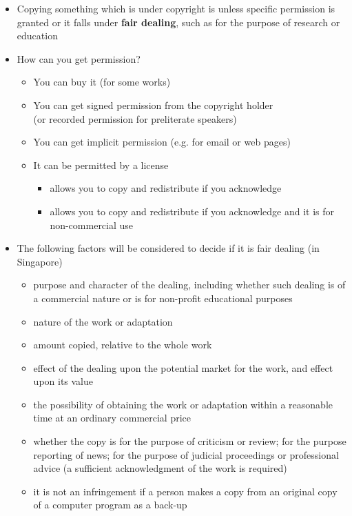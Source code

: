 \documentclass[a4paper,landscape,headrule,footrule,dvips]{foils}
\begin{document}
\begin{CJK}{UTF8}{min}
\begin{center}
\end{center}


\begin{itemize}
\item Copying something which is under copyright is  unless
  specific permission is granted or it falls under \textbf{fair
    dealing}, such as for the purpose of research or education
\item How can you get permission?
  \begin{itemize}
  \item You can buy it (for some works)
  \item You can get signed permission from the copyright holder
\\ (or recorded permission for preliterate speakers)
  \item You can get implicit permission (e.g. for email or web pages)
  \item It can be permitted by a license
    \begin{itemize}
    \item {} allows you to copy and redistribute if you acknowledge
    \item {} allows you to copy and redistribute if you
      acknowledge and it is for non-commercial use
    \end{itemize}
  \end{itemize}

\newpage {}
\item The following factors will be considered to decide if it is fair
  dealing (in Singapore)
  \begin{itemize}
  \item  purpose and character of the dealing, including whether such dealing is of a commercial nature or is for non-profit educational purposes
  \item  nature of the work or adaptation
  \item amount copied, relative to the whole work
  \item  effect of the dealing upon the potential market for the work, and effect upon its value
  \item the possibility of obtaining the work or adaptation within a reasonable time at an ordinary commercial price
  \item whether the copy is for the purpose of criticism or review; for the purpose reporting of news; for the purpose of judicial proceedings or professional advice (a sufficient acknowledgment of the work is required)
  \item it is not an infringement if a person makes a copy from an
    original copy of a computer program  as a back-up
  \end{itemize}
\end{itemize}


\end{CJK}
\end{document}
